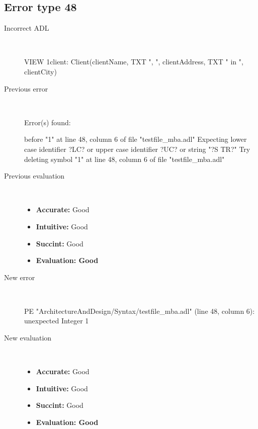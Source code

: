 \subsection{Error type 48}
  \begin{description}
  \item[Incorrect ADL]~\\
\begin{adl}
VIEW 1client: Client(clientName, TXT ", ", clientAddress, TXT " in ", clientCity)\end{adl}
  \item[Previous error]~\\
\begin{haskell}
Error(s) found:

before "1" at line 48, column 6 of file "testfile_mba.adl"
Expecting lower case identifier ?LC? or upper case identifier ?UC? or string "?S
TR?"
Try deleting symbol "1" at line 48, column 6 of file "testfile_mba.adl"
\end{haskell}
  \item[Previous evaluation]~\\
    \begin{itemize}
    \item \textbf{Accurate:} Good
    \item \textbf{Intuitive:} Good
    \item \textbf{Succint:} Good
    \item \textbf{Evaluation: Good}
    \end{itemize}
  \item[New error]~\\
\begin{haskell}
PE "ArchitectureAndDesign/Syntax/testfile_mba.adl" (line 48, column 6):
unexpected Integer 1\end{haskell}
  \item[New evaluation]~\\
    \begin{itemize}
    \item \textbf{Accurate:} Good
    \item \textbf{Intuitive:} Good
    \item \textbf{Succint:} Good
    \item \textbf{Evaluation: Good
}
    \end{itemize}
  \end{description}

\hrulefill

